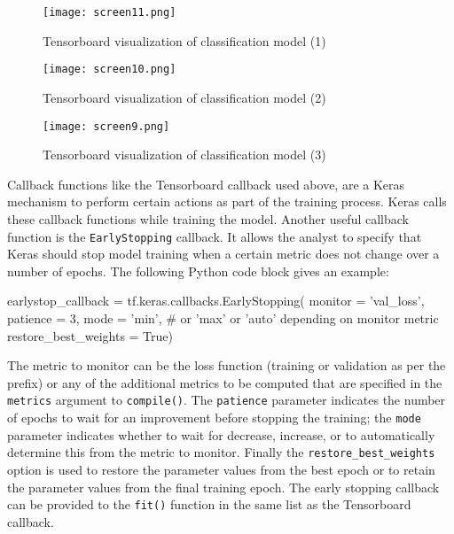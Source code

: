 \begin{figure}
\begin{center}
\texttt{[image: screen11.png]}
\end{center}
\caption{Tensorboard visualization of classification model (1)}
\label{fig:screen11_chap15}
\end{figure}

\begin{figure}
\centering
\texttt{[image: screen10.png]} 
\caption{Tensorboard visualization of classification model (2)}
\label{fig:screen10_chap15}
\end{figure}

\begin{figure}
\centering
\texttt{[image: screen9.png]}
\caption{Tensorboard visualization of classification model (3)}
\label{fig:screen9_chap15}
\end{figure}

Callback functions like the Tensorboard callback used above, are a Keras mechanism to perform certain actions as part of the training process. Keras calls these callback functions while training the model. Another useful callback function is the \texttt{EarlyStopping} callback. It allows the analyst to specify that Keras should stop model training when a certain metric does not change over a number of epochs. The following Python code block gives an example:

\begin{pythoncode}
earlystop_callback = tf.keras.callbacks.EarlyStopping(
    monitor = 'val_loss',
    patience = 3,
    mode = 'min', # or 'max' or 'auto' depending on monitor metric
    restore_best_weights = True)
\end{pythoncode}

The metric to monitor can be the loss function (training or validation as per the prefix) or any of the additional metrics to be computed that are specified in the \texttt{metrics} argument to \texttt{compile()}. The \texttt{patience} parameter indicates the number of epochs to wait for an improvement before stopping the training; the \texttt{mode} parameter indicates whether to wait for decrease, increase, or to automatically determine this from the metric to monitor. Finally the \texttt{restore\_best\_weights} option is used to restore the parameter values from the best epoch or to retain the parameter values from the final training epoch. The early stopping callback can be provided to the \texttt{fit()} function in the same list as the Tensorboard callback.

